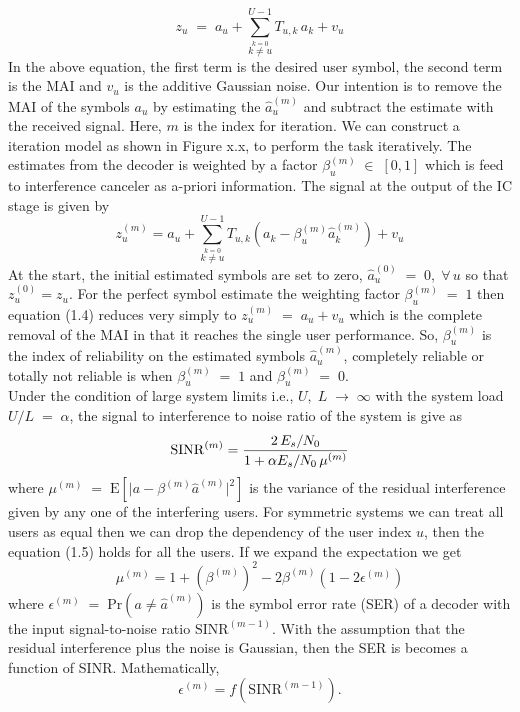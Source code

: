 \begin{equation}
z_u\;=\;a_u+\sum\limits_{\stackrel{k=0}{k\neq u}}^{U-1}T_{u,k}\,a_k+v_u
\end{equation}
In the above equation, the first term is the desired user symbol, the second term is the MAI and $v_u$ is the additive Gaussian noise. Our intention is to remove the MAI of the symbols $a_u$ by estimating the $\hat{a}_u^{(m)}$ and subtract the estimate with the received signal. Here, $m$ is the index for iteration. We can construct a iteration model as shown in Figure x.x, to perform the task iteratively. The estimates from the decoder is weighted by a factor $\beta_u^{(m)}\;\in\;[0,1]$ which is feed to interference canceler as a-priori information. The signal at the output of the IC stage is given by
\begin{equation}
z_u^{(m)}=a_u+\sum\limits_{\stackrel{k=0}{k\neq u}}^{U-1}T_{u,k}\left(a_k-\beta_u^{(m)}\hat{a}_k^{(m)}\right)+v_u
\end{equation}
At the start, the initial estimated symbols are set to zero, $\hat{a}_u^{(0)}\;=\;0,\;\forall\,u$ so that $z_u^{(0)}=z_u$. For the perfect symbol estimate the weighting factor $\beta_u^{(m)}\;=\;1$ then equation (1.4) reduces very simply to $z_u^{(m)}\;=\;a_u+v_u$ which is the complete removal of the MAI in that it reaches the single user performance. So, $\beta_u^{(m)}$ is the index of reliability on the estimated symbols $\hat{a}_u^{(m)}$, completely reliable or totally not reliable is when $\beta_u^{(m)}\;=\;1$ and $\beta_u^{(m)}\;=\;0$. \\

Under the condition of large system limits i.e., $U,\;L\;\rightarrow\;\infty$ with the system load $U/L\;=\;\alpha$, the signal to interference to noise ratio of the system is give as
\begin{equation}
\mathrm{SINR}^{(m)}=\frac{\hbox{$2\,E_s/N_0$}}{\hbox{$1+\alpha E_s/N_0\,\mu^{(m)}$}}
\end{equation}
where $\mu^{(m)}\;=\;\mathrm{E}[\vert a - \beta^{(m)} \hat{a}^{(m)}\vert^2]$ is the variance of the residual interference given by any one of the interfering users. For symmetric systems we can treat all users as equal then we can drop the dependency of the user index $u$, then the equation (1.5) holds for all the users. If we expand the expectation we get
\begin{equation}
\mu^{(m)}=1+\left(\beta^{(m)}\right)^2-2\beta^{(m)}\left(1-2\epsilon^{(m)}\right)
\end{equation}
where $\epsilon^{(m)}\;=\;\mathrm{Pr}(a\neq \hat{a}^{(m)})$ is the symbol error rate (SER) of a decoder with the input signal-to-noise ratio $\mathrm{SINR}^{(m-1)}$. With the assumption that the residual interference plus the noise is Gaussian, then the SER is becomes a function of SINR. Mathematically,
\begin{equation}
\epsilon^{(m)}=f\left(\mathrm{SINR}^{(m-1)}\right).
\end{equation}

